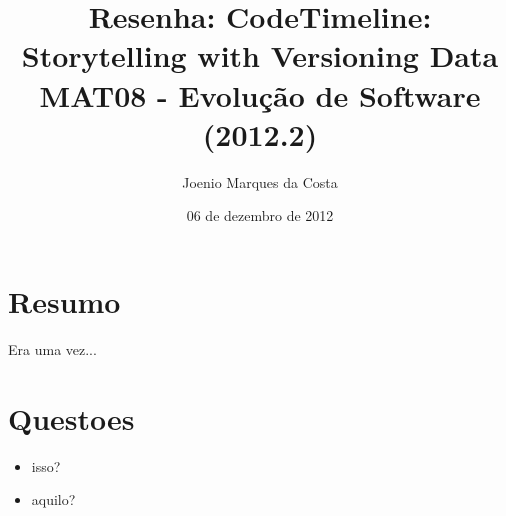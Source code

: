 \documentclass[12pt]{article}
\title{Resenha: CodeTimeline: Storytelling with Versioning Data\cite{CodeTimeline} \\
 \large MAT08 - Evolução de Software (2012.2)}
\author{Joenio Marques da Costa}
\date{06 de dezembro de 2012}
\begin{document}
\maketitle

\section{Resumo}

Era uma vez...

\section{Questoes}

\begin{itemize}
  \item isso?
  \item aquilo?
\end{itemize}


\end{document}

